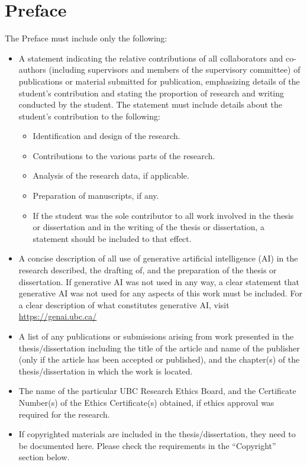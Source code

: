 \renewcommand{\abstractname}{Lay Summary}

\begin{abstract}
Effective January 2018, all theses and dissertations must include a lay summary. The lay summary explains the key goals and contributions of the research/scholarly work in terms that can be understood by the general public. It does not use technical terms and discipline-specific language. It must not exceed 150 words in length.
\end{abstract}

\chapter{Preface}
The Preface must include only the following:
\begin{itemize}
    \item A statement indicating the relative contributions of all collaborators and co-authors (including supervisors and members of the supervisory committee) of publications or material submitted for publication, emphasizing details of the student’s contribution and stating the proportion of research and writing conducted by the student. The statement must include details about the student’s contribution to the following:
    \begin{itemize}
        \item Identification and design of the research.
        \item Contributions to the various parts of the research.
        \item Analysis of the research data, if applicable.
        \item Preparation of manuscripts, if any.
        \item If the student was the sole contributor to all work involved in the thesis or dissertation and in the writing of the thesis or dissertation, a statement should be included to that effect.
    \end{itemize}
    \item A concise description of all use of generative artificial intelligence (AI)  in the research described, the drafting of, and the preparation of the thesis or dissertation.  If generative AI was not used in any way, a clear statement that generative AI was not used for any aspects of this work must be included. For a clear description of what constitutes generative AI, visit \url{https://genai.ubc.ca/}
    \item A list of any publications or submissions arising from work presented in the thesis/dissertation including the title of the article and name of the publisher (only if the article has been accepted or published), and the chapter(s) of the thesis/dissertation in which the work is located.
    \item The name of the particular UBC Research Ethics Board, and the Certificate Number(s) of the Ethics Certificate(s) obtained, if ethics approval was required for the research.
    \item If copyrighted materials are included in the thesis/dissertation, they need to be documented here. Please check the requirements in the “Copyright” section below.
\end{itemize}

